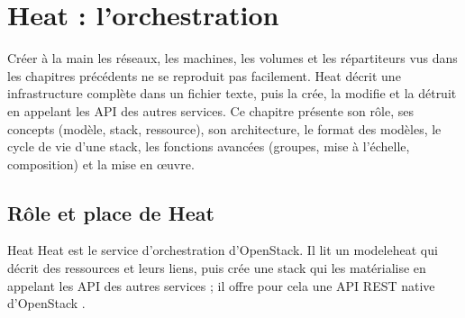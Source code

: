 
\section{Heat : l'orchestration}\label{chap:heat}

Créer à la main les réseaux, les machines, les volumes et les répartiteurs vus dans les chapitres précédents ne se reproduit pas
facilement. Heat décrit une infrastructure complète dans un fichier texte, puis la crée, la modifie et la détruit en appelant
les API des autres services. Ce chapitre présente son rôle, ses concepts (modèle, stack, ressource), son architecture, le format
des modèles, le cycle de vie d'une stack, les fonctions avancées (groupes, mise à l'échelle, composition) et la mise en œuvre.

\subsection{Rôle et place de Heat}\label{sec:he-role}

\begin{definition}{Heat}
Heat est le service d'orchestration d'OpenStack. Il lit un \gls{modeleheat} qui décrit des ressources et leurs liens, puis crée
une \gls{stack} qui les matérialise en appelant les API des autres services ; il offre pour cela une API REST native d'OpenStack
\parencite{heat-index}.
\end{definition}

